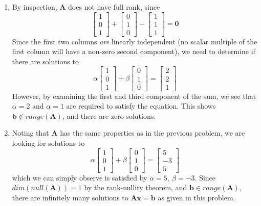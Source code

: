 \documentclass[]{article}
\newcommand{\bbm}{\begin{bmatrix}}		%
\newcommand{\ebm}{\end{bmatrix}}		%
\newcommand{\A}{\bm{A}}					%
\begin{document}
\begin{enumerate}[resume]
\begin{enumerate}
	  \item By inspection, $\A$ does not have full rank, since
        $$ \bbm 1\\0\\1 \ebm + \bbm 0\\1\\0 \ebm - \bbm 1\\1\\1 \ebm =
        \bm{0} $$ Since the first two columns {\em are} linearly
        independent (no scalar multiple of the first column will have
        a non-zero second component), we need to determine if there
        are solutions to
        $$ \alpha \bbm 1\\0\\1 \ebm + \beta \bbm 0\\1\\0 \ebm = \bbm
        2\\2\\1 \ebm $$ However, by examining the first and third
        component of the sum, we see that $\alpha = 2$ and $\alpha =
        1$ are required to satisfy the equation. This shows $\bm{b}
        \not\in range(\A)$, and there are zero solutions.
        
	  \item Noting that $\A$ has the same properties as in the
        previous problem, we are looking for solutions to
        $$ \alpha \bbm 1\\0\\1 \ebm + \beta \bbm 0\\1\\0 \ebm = \bbm
        5\\-3\\5 \ebm $$ which we can simply observe is satisfied by
        $\alpha = 5,~\beta = -3$. Since $dim(null(\A)) = 1$ by the
        rank-nullity theorem, and $\bm{b} \in range(\A)$, there are
        infinitely many solutions to $\A\bm{x} = \bm{b}$ as given in
        this problem.
	  \end{enumerate}
    \end{enumerate}
\end{document}
